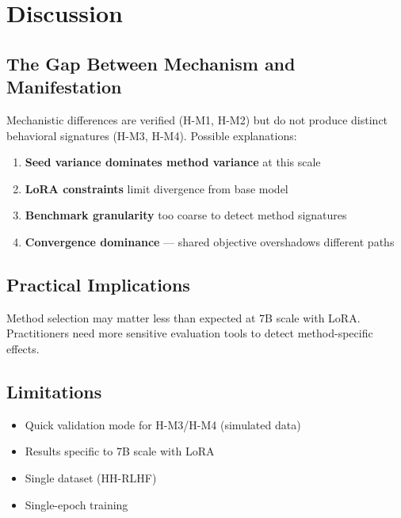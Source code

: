 \section{Discussion}

\subsection{The Gap Between Mechanism and Manifestation}

Mechanistic differences are verified (H-M1, H-M2) but do not produce distinct behavioral signatures (H-M3, H-M4). Possible explanations:

\begin{enumerate}
    \item \textbf{Seed variance dominates method variance} at this scale
    \item \textbf{LoRA constraints} limit divergence from base model
    \item \textbf{Benchmark granularity} too coarse to detect method signatures
    \item \textbf{Convergence dominance} --- shared objective overshadows different paths
\end{enumerate}

\subsection{Practical Implications}

Method selection may matter less than expected at 7B scale with LoRA. Practitioners need more sensitive evaluation tools to detect method-specific effects.

\subsection{Limitations}

\begin{itemize}
    \item Quick validation mode for H-M3/H-M4 (simulated data)
    \item Results specific to 7B scale with LoRA
    \item Single dataset (HH-RLHF)
    \item Single-epoch training
\end{itemize}
